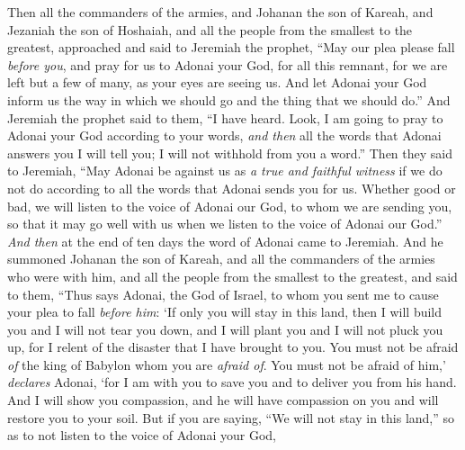 \begin{biblechapter} %
 Then all the commanders of the armies, and Johanan the son of Kareah, and Jezaniah the son of Hoshaiah, and all the people from the smallest to the greatest, approached
\verse and said to Jeremiah the prophet, “May our plea please fall \textit{before you}, and pray for us to Adonai your God, for all this remnant, for we are left but a few of many, as your eyes are seeing us.
\verse And let Adonai your God inform us the way in which we should go and the thing that we should do.”
\verse And Jeremiah the prophet said to them, “I have heard. Look, I am going to pray to Adonai your God according to your words, \textit{and then} all the words that Adonai answers you I will tell you; I will not withhold from you a word.”
\verse Then they said to Jeremiah, “May Adonai be against us as \textit{a true and faithful witness} if we do not do according to all the words that Adonai sends you for us.
\verse Whether good or bad, we will listen to the voice of Adonai our God, to whom we are sending you, so that it may go well with us when we listen to the voice of Adonai our God.”
 \textit{And then} at the end of ten days the word of Adonai came to Jeremiah.
\verse And he summoned Johanan the son of Kareah, and all the commanders of the armies who were with him, and all the people from the smallest to the greatest,
\verse and said to them, “Thus says Adonai, the God of Israel, to whom you sent me to cause your plea to fall \textit{before him}:
\verse ‘If only you will stay in this land, then I will build you and I will not tear you down, and I will plant you and I will not pluck you up, for I relent of the disaster that I have brought to you.
\verse You must not be afraid \textit{of} the king of Babylon whom you are \textit{afraid of}. You must not be afraid of him,’ \textit{declares} Adonai, ‘for I am with you to save you and to deliver you from his hand.
\verse And I will show you compassion, and he will have compassion on you and will restore you to your soil.
\verse But if you are saying, “We will not stay in this land,” so as to not listen to the voice of Adonai your God,

\end{biblechapter}
